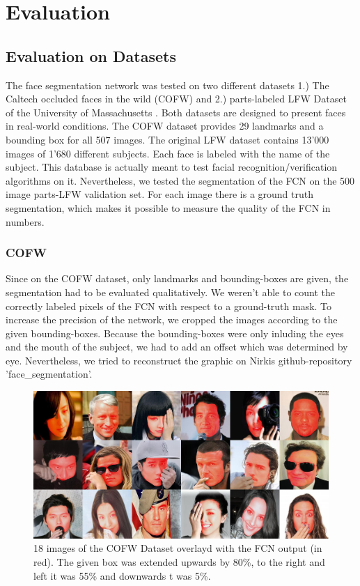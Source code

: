 \chapter{Evaluation}
\section{Evaluation on Datasets}
\label{sec:EvaluationOnDatasets} %
The face segmentation network was tested on two different datasets 1.) The Caltech occluded faces in the wild (COFW) and 2.) parts-labeled LFW Dataset of the University of Massachusetts \cite{LFW_dataset}. Both datasets are designed to present faces in real-world conditions. The COFW dataset provides 29 landmarks and a bounding box for all 507 images. The original LFW dataset contains 13'000 images of 1'680 different subjects. Each face is labeled with the name of the subject. This database is actually meant to test facial recognition/verification algorithms on it. Nevertheless, we tested the segmentation of the FCN on the 500 image parts-LFW validation set. For each image there is a ground truth segmentation, which makes it possible to measure the quality of the FCN in numbers.
\\

\subsection{COFW}
Since on the COFW dataset, only landmarks and bounding-boxes are given, the segmentation had to be evaluated qualitatively. We weren't able to count the correctly labeled pixels of the FCN with respect to a ground-truth mask. To increase the precision of the network, we cropped the images according to the given bounding-boxes. Because the bounding-boxes were only inluding the eyes and the mouth of the subject, we had to add an offset which was determined by eye. Nevertheless, we tried to reconstruct the graphic on Nirkis \cite{nirkin2018_faceswap} github-repository 'face\_segmentation'.
\begin{figure}[h]
	\centering
	\includegraphics[width=1\textwidth]{Figures/myMatrix.jpg}
	\caption{18 images of the COFW Dataset overlayd with the FCN output (in red). The given box was extended upwards by 80\%, to the right and left it was 55\% and downwards t was 5\%.}
	\label{figure2}
\end{figure}


